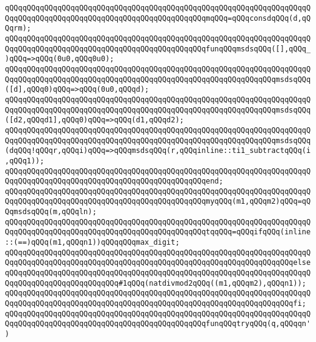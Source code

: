 \verb|qQQqqQQqqQQqqQQqqQQqqQQqqQQqqQQqqQQqqQQqqQQqqQQqqQQqqQQqqQQqqQQqqQQqqQQqqQQqqQQqqQQqqQQqqQQqqQQqqQQqqQQqqQQqqQQqqQQqmqQQq=qQQqconsdqQQq(d,qQQqrm);|\newline
\newline
\verb|qQQqqQQqqQQqqQQqqQQqqQQqqQQqqQQqqQQqqQQqqQQqqQQqqQQqqQQqqQQqqQQqqQQqqQQqqQQqqQQqqQQqqQQqqQQqqQQqqQQqqQQqqQQqqQQqqQQqfunqQQqmsdsqQQq([],qQQq_)qQQq=>qQQq(0u0,qQQq0u0);|\newline
\verb|qQQqqQQqqQQqqQQqqQQqqQQqqQQqqQQqqQQqqQQqqQQqqQQqqQQqqQQqqQQqqQQqqQQqqQQqqQQqqQQqqQQqqQQqqQQqqQQqqQQqqQQqqQQqqQQqqQQqqQQqqQQqqQQqqQQqmsdsqQQq([d],qQQq0)qQQq=>qQQq(0u0,qQQqd);|\newline
\verb|qQQqqQQqqQQqqQQqqQQqqQQqqQQqqQQqqQQqqQQqqQQqqQQqqQQqqQQqqQQqqQQqqQQqqQQqqQQqqQQqqQQqqQQqqQQqqQQqqQQqqQQqqQQqqQQqqQQqqQQqqQQqqQQqqQQqmsdsqQQq([d2,qQQqd1],qQQq0)qQQq=>qQQq(d1,qQQqd2);|\newline
\verb|qQQqqQQqqQQqqQQqqQQqqQQqqQQqqQQqqQQqqQQqqQQqqQQqqQQqqQQqqQQqqQQqqQQqqQQqqQQqqQQqqQQqqQQqqQQqqQQqqQQqqQQqqQQqqQQqqQQqqQQqqQQqqQQqqQQqmsdsqQQq(dqQQq!qQQqr,qQQqi)qQQq=>qQQqmsdsqQQq(r,qQQqinline::ti1_subtractqQQq(i,qQQq1));|\newline
\verb|qQQqqQQqqQQqqQQqqQQqqQQqqQQqqQQqqQQqqQQqqQQqqQQqqQQqqQQqqQQqqQQqqQQqqQQqqQQqqQQqqQQqqQQqqQQqqQQqqQQqqQQqqQQqqQQqqQQqend;|\newline
\newline
\verb|qQQqqQQqqQQqqQQqqQQqqQQqqQQqqQQqqQQqqQQqqQQqqQQqqQQqqQQqqQQqqQQqqQQqqQQqqQQqqQQqqQQqqQQqqQQqqQQqqQQqqQQqqQQqqQQqqQQqmyqQQq(m1,qQQqm2)qQQq=qQQqmsdsqQQq(m,qQQqln);|\newline
\newline
\verb|qQQqqQQqqQQqqQQqqQQqqQQqqQQqqQQqqQQqqQQqqQQqqQQqqQQqqQQqqQQqqQQqqQQqqQQqqQQqqQQqqQQqqQQqqQQqqQQqqQQqqQQqqQQqqQQqqQQqtqqQQq=qQQqifqQQq(inline::(==)qQQq(m1,qQQqn1))qQQqqQQqmax_digit;|\newline
\verb|qQQqqQQqqQQqqQQqqQQqqQQqqQQqqQQqqQQqqQQqqQQqqQQqqQQqqQQqqQQqqQQqqQQqqQQqqQQqqQQqqQQqqQQqqQQqqQQqqQQqqQQqqQQqqQQqqQQqqQQqqQQqqQQqqQQqqQQqelseqQQqqQQqqQQqqQQqqQQqqQQqqQQqqQQqqQQqqQQqqQQqqQQqqQQqqQQqqQQqqQQqqQQqqQQqqQQqqQQqqQQqqQQqqQQqqQQq#1qQQq(natdivmod2qQQq((m1,qQQqm2),qQQqn1));|\newline
\verb|qQQqqQQqqQQqqQQqqQQqqQQqqQQqqQQqqQQqqQQqqQQqqQQqqQQqqQQqqQQqqQQqqQQqqQQqqQQqqQQqqQQqqQQqqQQqqQQqqQQqqQQqqQQqqQQqqQQqqQQqqQQqqQQqqQQqqQQqfi;|\newline
\newline
\verb|qQQqqQQqqQQqqQQqqQQqqQQqqQQqqQQqqQQqqQQqqQQqqQQqqQQqqQQqqQQqqQQqqQQqqQQqqQQqqQQqqQQqqQQqqQQqqQQqqQQqqQQqqQQqqQQqqQQqfunqQQqtryqQQq(q,qQQqqn')|\newline
